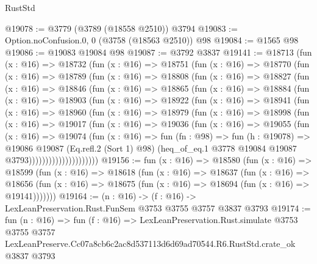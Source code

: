 \begin{lexlean}{RustStd}
\begin{coremodule}
@19078 := @3779 (@3789 (@18558 @2510)) @3794
@19083 := Option.noConfusion.{0, 0} (@3758 (@18563 @2510)) @98
@19084 := @1565 @98
@19086 := @19083 @19084 @98
@19087 := @3792 @3837
@19141 := @18713
    (fun (x : @16) =>
    @18732
      (fun (x : @16) =>
      @18751
        (fun (x : @16) =>
        @18770
          (fun (x : @16) =>
          @18789
            (fun (x : @16) =>
            @18808
              (fun (x : @16) =>
              @18827
                (fun (x : @16) =>
                @18846
                  (fun (x : @16) =>
                  @18865
                    (fun (x : @16) =>
                    @18884
                      (fun (x : @16) =>
                      @18903
                        (fun (x : @16) =>
                        @18922
                          (fun (x : @16) =>
                          @18941
                            (fun (x : @16) =>
                            @18960
                              (fun (x : @16) =>
                              @18979
                                (fun (x : @16) =>
                                @18998
                                  (fun (x : @16) =>
                                  @19017
                                    (fun (x : @16) =>
                                    @19036
                                      (fun (x : @16) =>
                                      @19055
                                        (fun (x : @16) =>
                                        @19074
                                          (fun (x : @16) =>
                                          fun (fn : @98) =>
                                          fun (h : @19078) =>
                                          @19086
                                            @19087
                                            (Eq.refl.{2} (Sort 1) @98)
                                            (heq_of_eq.{1}
                                              @3778
                                              @19084
                                              @19087
                                              @3793)))))))))))))))))))))
@19156 := fun (x : @16) =>
  @18580
    (fun (x : @16) =>
    @18599
      (fun (x : @16) =>
      @18618
        (fun (x : @16) =>
        @18637
          (fun (x : @16) =>
          @18656 (fun (x : @16) => @18675 (fun (x : @16) => @18694 (fun (x : @16) => @19141)))))))
@19164 := (n : @16) -> (f : @16) -> LexLeanPreservation.Rust.FunSem @3753 @3755 @3757 @3837 @3793
@19174 := fun (n : @16) =>
  fun (f : @16) =>
  LexLeanPreservation.Rust.simulate
    @3753
    @3755
    @3757
    LexLeanPreserve.Cc07a8cb6c2ac8d537113d6d69ad70544.R6.RustStd.crate_ok
    @3837
    @3793
\end{coremodule}
\end{lexlean}
